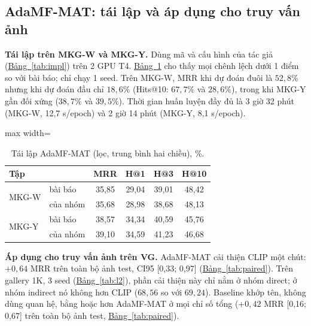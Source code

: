 \documentclass[conference]{IEEEtran}
\begin{document}
\subsection{AdaMF-MAT: tái lập và áp dụng cho truy vấn ảnh}\label{sec:r-repro}
\textbf{Tái lập trên MKG-W và MKG-Y.} Dùng mã và cấu hình của tác giả (\hyperref[tab:impl]{Bảng~\ref*{tab:impl}}) trên 2 GPU T4. \hyperref[tab:repro]{Bảng~\ref*{tab:repro}} cho thấy mọi chênh lệch dưới 1 điểm so với bài báo; chỉ chạy 1 seed. Trên MKG-W, MRR khi dự đoán đuôi là $52{,}8\%$ nhưng khi dự đoán đầu chỉ $18{,}6\%$ (Hits@10: $67{,}7\%$ và $28{,}6\%$), trong khi MKG-Y gần đối xứng ($38{,}7\%$ và $39{,}5\%$). Thời gian huấn luyện đầy đủ là 3 giờ 32 phút (MKG-W, 12,7 s/epoch) và 2 giờ 14 phút (MKG-Y, 8,1 s/epoch).

\begin{table}[t]
\caption{Tái lập AdaMF-MAT (lọc, trung bình hai chiều), \%.}\label{tab:repro}
\centering\small
\begin{adjustbox}{max width=\columnwidth}
\begin{tabular}{llcccc}
\toprule
Tập & & MRR & H@1 & H@3 & H@10\\\midrule
\multirow{2}{*}{MKG-W} & bài báo & 35,85 & 29,04 & 39,01 & 48,42\\
 & của nhóm & 35,68 & 28,98 & 38,68 & 48,13\\\midrule
\multirow{2}{*}{MKG-Y} & bài báo & 38,57 & 34,34 & 40,59 & 45,76\\
 & của nhóm & 39,10 & 34,59 & 41,23 & 46,68\\\bottomrule
\end{tabular}
\end{adjustbox}
\end{table}

\textbf{Áp dụng cho truy vấn ảnh trên VG.} AdaMF-MAT cải thiện CLIP một chút: $+0{,}64$ MRR trên toàn bộ ảnh test, CI95 [0,33; 0,97] (\hyperref[tab:paired]{Bảng~\ref*{tab:paired}}). Trên gallery 1K, 3 seed (\hyperref[tab:l2]{Bảng~\ref*{tab:l2}}), phần cải thiện này chỉ nằm ở nhóm direct; ở nhóm indirect nó không hơn CLIP ($68{,}56$ so với $69{,}24$). Baseline khớp tên, không dùng quan hệ, bằng hoặc hơn AdaMF-MAT ở mọi chỉ số tổng ($+0{,}42$ MRR [0,16; 0,67] trên toàn bộ ảnh test, \hyperref[tab:paired]{Bảng~\ref*{tab:paired}}).
\end{document}
